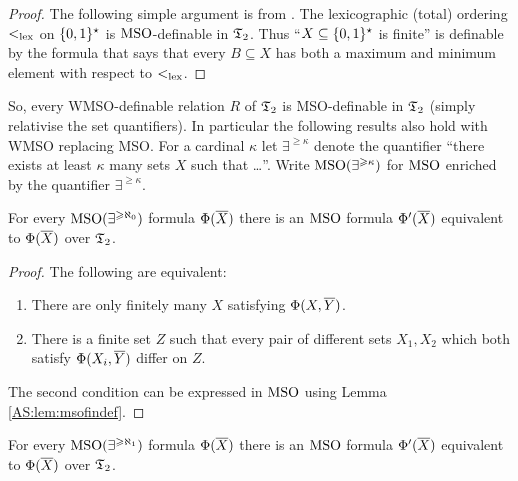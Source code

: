 \begin{proof}
The following simple argument is from \cite{Rabi69}.
The lexicographic (total) ordering $<_{\mathrm{lex}}$ on $\{0,1\}^\star$ is $\mbox{\rm MSO}$-definable in $\mathfrak{T}_2$.
Thus ``$X \subseteq \{0,1\}^\star$ is finite'' is definable by the formula that says that every $B \subseteq X$ has
both a maximum and minimum element with respect to $<_{\mathrm{lex}}$.
\end{proof}

So, every WMSO-definable relation $R$ of $\mathfrak{T}_2$ is MSO-definable in $\mathfrak{T}_2$ 
(simply relativise the set quantifiers). In particular the following results also hold with WMSO replacing MSO.
For a cardinal $\kappa$ let $\exists^{\geq \kappa}$ denote the quantifier ``there exists at least $\kappa$ many sets $X$ such that \dots''.
Write $\mbox{\rm {MSO}}(\exists^{\geqslant \kappa})$ for $\mbox{\rm MSO}$ enriched by the quantifier $\exists^{\geq \kappa}$. 

\begin{proposition} \cite{BKRa}
For every $\mbox{\rm {MSO}}(\exists^{\geqslant \aleph_0})$ formula $\Phi(\mbox{$\overline {X}$})$ there is an $\mbox{\rm MSO}$ formula 
$\Phi'(\mbox{$\overline {X}$})$ equivalent to $\Phi(\mbox{$\overline {X}$})$ over $\mathfrak{T}_2$.
\end{proposition}

\begin{proof}
The following are equivalent:
\begin{enumerate}
\item There are only finitely many $X$ satisfying $\Phi(X,\mbox{$\overline {Y}$})$. 
\item There is a finite set $Z$ such that every pair of different sets $X_1,X_2$ which both satisfy $\Phi(X_i,\mbox{$\overline {Y}$})$ differ on $Z$.
\end{enumerate}
The second condition can be expressed in $\mbox{\rm MSO}$ using Lemma \ref{AS:lem:msofindef}.
\end{proof}

\begin{theorem} \cite{BKRa}
For every $\mbox{\rm {MSO}}(\exists^{\geqslant \aleph_1})$ formula $\Phi(\mbox{$\overline {X}$})$ there is an $\mbox{\rm MSO}$ formula
$\Phi'(\mbox{$\overline {X}$})$ equivalent to $\Phi(\mbox{$\overline {X}$})$ over $\mathfrak{T}_2$.
\end{theorem}

